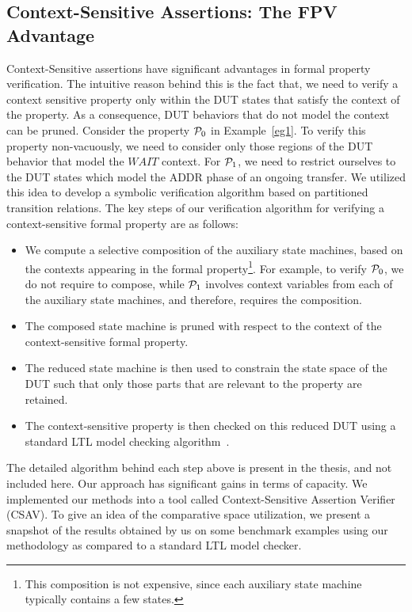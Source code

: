 \documentclass[a4paper, 11pt]{article}
\begin{document}
\subsection{Context-Sensitive Assertions: The FPV Advantage} \label{sec5.2}
Context-Sensitive assertions have significant advantages in formal 
property verification. The intuitive reason behind this is the fact that,
we need to verify a context sensitive property only within the DUT
states that satisfy the context of the property. As a consequence, DUT 
behaviors that do not model the context can be pruned. Consider the 
property ${\cal P}_0$ in Example~\ref{eg1}. To verify this property 
non-vacuously, we need to consider only those regions of the DUT behavior 
that model the $WAIT$ context. For ${\cal P}_1$, we need to restrict 
ourselves to the DUT states which model the ADDR phase of an ongoing 
transfer. We utilized this idea to develop a symbolic verification 
algorithm based on partitioned transition relations.
The key steps of our verification algorithm for verifying a 
context-sensitive formal property are as follows:
\begin{itemize} 
\item We compute a selective composition of the auxiliary state machines, 
	based on the contexts appearing in the formal property\footnote{This 
	composition is not expensive, since each auxiliary state machine 
	typically contains a few states.}. For example, to verify ${\cal P}_0$, 
	we do not require to compose, while ${\cal P}_1$ involves context
	variables from each of the auxiliary state machines, and therefore, 
	requires the composition.
\item The composed state machine is pruned with respect to the 
	context of the context-sensitive formal property. 
\item The reduced state machine is then used to
	constrain the state space of the DUT such that
	only those parts that are relevant to the property are retained.
\item The context-sensitive property is then checked on this reduced 
	DUT using a standard LTL model checking algorithm~\cite{clarke:00}.
\end{itemize}

\noindent
The detailed algorithm behind each step above is present in the thesis, 
and not included here. Our approach has significant gains in terms of 
capacity. We implemented our methods into a tool called Context-Sensitive 
Assertion 
Verifier (CSAV). To give an idea of the comparative space utilization, 
we present a snapshot of the results obtained by us on some benchmark 
examples using our methodology as compared to a standard LTL model 
checker. 
\end{document}
